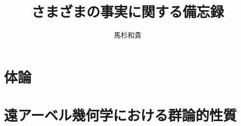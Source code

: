 \documentclass[dvipdfmx, report]{jsbook}
\title{さまざまの事実に関する備忘録}
\author{馬杉和貴}
\date{}
\theoremstyle{definition}
\begin{document}
\maketitle



\chapter{体論}



\chapter{遠アーベル幾何学における群論的性質}








\end{document}
